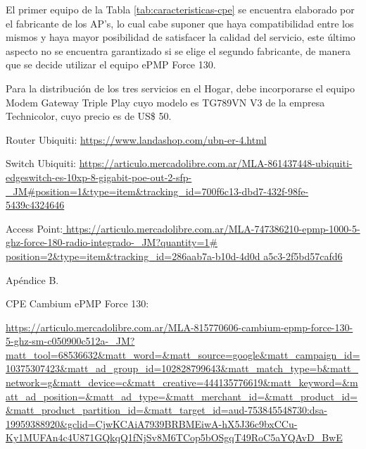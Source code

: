 El primer equipo de la Tabla \ref{tab:caracteristicas-cpe} se encuentra elaborado por el fabricante de los AP's, lo cual cabe suponer que haya compatibilidad entre los mismos y haya mayor posibilidad de satisfacer la calidad del servicio, este último aspecto no se encuentra garantizado si se elige el segundo fabricante, de manera que se decide utilizar el equipo ePMP Force 130.

Para la distribución de los tres servicios en el Hogar, debe incorporarse el equipo Modem Gateway Triple Play cuyo modelo es TG789VN V3 de la empresa Technicolor, cuyo precio es de US\$ 50.



\newpage






\begin{thebibliography}{99}

 Router Ubiquiti: {\tiny \url{https://www.landashop.com/ubn-er-4.html}}


 Switch Ubiquiti: {\tiny \url{https://articulo.mercadolibre.com.ar/MLA-861437448-ubiquiti-edgeswitch-es-10xp-8-gigabit-poe-out-2-sfp-_JM#position=1&type=item&tracking_id=700f6c13-dbd7-432f-98fe-5439c4324646}}



Access Point:{\tiny \url{ https://articulo.mercadolibre.com.ar/MLA-747386210-epmp-1000-5-ghz-force-180-radio-integrado-_JM?quantity=1# position=2&type=item&tracking_id=286aab7a-b10d-4d0d a5c3-2f5bd57cafd6}}


 Apéndice B.

CPE Cambium ePMP Force 130: \begin{tiny}
\url{https://articulo.mercadolibre.com.ar/MLA-815770606-cambium-epmp-force-130-5-ghz-sm-c050900c512a-_JM?matt_tool=68536632&matt_word=&matt_source=google&matt_campaign_id=10375307423&matt_ad_group_id=102828799643&matt_match_type=b&matt_network=g&matt_device=c&matt_creative=444135776619&matt_keyword=&matt_ad_position=&matt_ad_type=&matt_merchant_id=&matt_product_id=&matt_product_partition_id=&matt_target_id=aud-753845548730:dsa-19959388920&gclid=CjwKCAiA7939BRBMEiwA-hX5J36c9bxCCu-Ky1MUFAn4c4U871GQkqQ1fNjSv8M6TCop5bOSgqT49RoC5aYQAvD_BwE}
\end{tiny}
\end{thebibliography}

\newpage